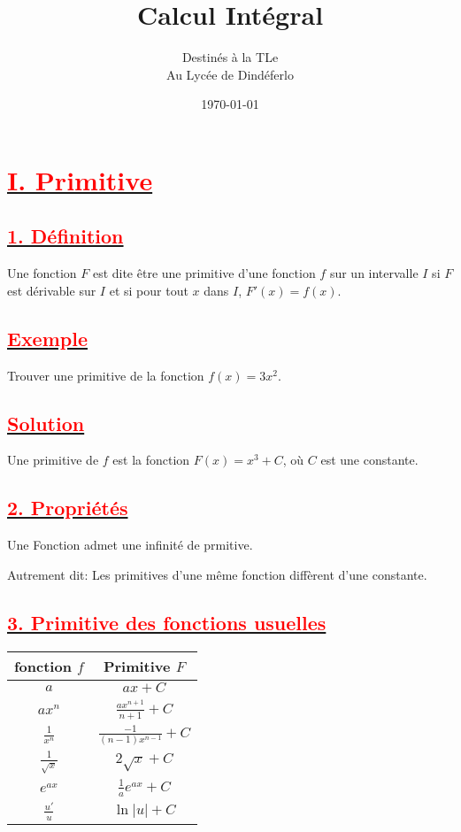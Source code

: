 \documentclass[12pt]{article}
\author{Destinés à la TLe\\Au Lycée de Dindéferlo}
\title{\textbf{Calcul Intégral}}
\date{\today}
\begin{document}
\maketitle
\newpage

\section*{\underline{\textbf{\textcolor{red}{I. Primitive}}}}

\subsection*{\underline{\textbf{\textcolor{red}{1. Définition}}}}
Une fonction $F$ est dite être une primitive d'une fonction $f$ sur un intervalle $I$ si $F$ est dérivable sur $I$ et si pour tout $x$ dans $I$, $F'(x) = f(x)$.

\subsection*{\underline{\textbf{\textcolor{red}{Exemple}}}}
Trouver une primitive de la fonction $f(x) = 3x^2$.

\subsection*{\underline{\textbf{\textcolor{red}{Solution}}}}
Une primitive de $f$ est la fonction $F(x) = x^3 + C$, où $C$ est une constante.

\subsection*{\underline{\textbf{\textcolor{red}{2. Propriétés}}}}
Une Fonction admet une infinité de prmitive.

Autrement dit: Les primitives d'une même fonction diffèrent d'une constante.
\subsection*{\underline{\textbf{\textcolor{red}{3. Primitive des fonctions usuelles}}}}
\begin{table}[h]
\centering
\begin{tabular}{|c|c|}
\hline
fonction \(f\) & Primitive \(F\) \\ \hline
\(a\) & \(ax + C\) \\ \hline
\(ax^{n}\) & \(\frac{ax^{n+1}}{n+1} + C\) \\ \hline
\(\frac{1}{x^{n}}\) & \(\frac{-1}{(n-1)x^{n-1}} + C\) \\ \hline
\(\frac{1}{\sqrt{x}}\) & \(2\sqrt{x} + C\) \\ \hline
\(e^{ax}\) & \(\frac{1}{a}e^{ax} + C\) \\ \hline
\(\frac{u'}{u}\) & \(\ln |u| + C\) \\ \hline
\end{tabular}
\end{table}
\end{document}
